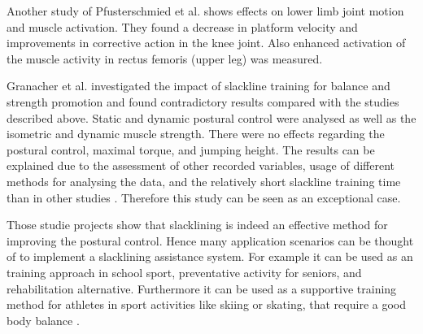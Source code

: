 Another study of Pfusterschmied et al. \cite{Pfusterschmied2013-kq} shows effects on lower limb joint motion and muscle activation. They found a decrease in platform velocity and improvements in corrective action in the knee joint. Also enhanced activation of the muscle activity in rectus femoris (upper leg) was measured.

Granacher et al. \cite{Granacher2010-ow} investigated the impact of slackline training for balance and strength promotion and found contradictory results compared with the studies described above. Static and dynamic postural control were analysed as well as the isometric and dynamic muscle strength. There were no effects regarding the postural control, maximal torque, and jumping height. The results can be explained due to the assessment of other recorded variables, usage of different methods for analysing the data, and the relatively short slackline training time than in other studies \cite{Pfusterschmied2013-yy}. Therefore this study can be seen as an exceptional case.

Those studie projects show that slacklining is indeed an effective method for improving the postural control. Hence many application scenarios can be thought of to implement a slacklining assistance system. For example it can be used as an training approach in school sport, preventative activity for seniors, and rehabilitation alternative. Furthermore it can be used as a supportive training method for athletes in sport activities like skiing or skating, that require a good body balance \cite{Pfusterschmied2013-yy}.
